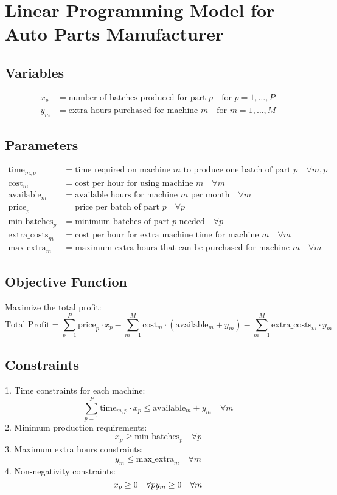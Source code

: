\documentclass{article}
\begin{document}
\section*{Linear Programming Model for Auto Parts Manufacturer}

\subsection*{Variables}
\begin{align*}
x_p & = \text{number of batches produced for part } p \quad \text{for } p = 1, \ldots, P \\
y_m & = \text{extra hours purchased for machine } m \quad \text{for } m = 1, \ldots, M 
\end{align*}

\subsection*{Parameters}
\begin{align*}
\text{time}_{m,p} & = \text{time required on machine } m \text{ to produce one batch of part } p \quad \forall m, p \\
\text{cost}_m & = \text{cost per hour for using machine } m \quad \forall m \\
\text{available}_m & = \text{available hours for machine } m \text{ per month} \quad \forall m \\
\text{price}_p & = \text{price per batch of part } p \quad \forall p \\
\text{min\_batches}_p & = \text{minimum batches of part } p \text{ needed} \quad \forall p \\
\text{extra\_costs}_m & = \text{cost per hour for extra machine time for machine } m \quad \forall m \\
\text{max\_extra}_m & = \text{maximum extra hours that can be purchased for machine } m \quad \forall m 
\end{align*}

\subsection*{Objective Function}
Maximize the total profit:
\[
\text{Total Profit} = \sum_{p=1}^{P} \text{price}_p \cdot x_p - \sum_{m=1}^{M} \text{cost}_m \cdot \left(\text{available}_m + y_m\right) - \sum_{m=1}^{M} \text{extra\_costs}_m \cdot y_m
\]

\subsection*{Constraints}
1. Time constraints for each machine:
\[
\sum_{p=1}^{P} \text{time}_{m,p} \cdot x_p \leq \text{available}_m + y_m \quad \forall m
\]
2. Minimum production requirements:
\[
x_p \geq \text{min\_batches}_p \quad \forall p
\]
3. Maximum extra hours constraints:
\[
y_m \leq \text{max\_extra}_m \quad \forall m
\]
4. Non-negativity constraints:
\[
x_p \geq 0 \quad \forall p \\
y_m \geq 0 \quad \forall m 
\]
\end{document}
